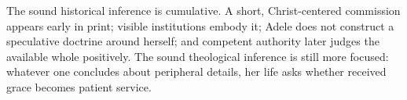 The sound historical inference is cumulative. A short, Christ-centered commission appears early in print; visible institutions embody it; Adele does not construct a speculative doctrine around herself; and competent authority later judges the available whole positively. The sound theological inference is still more focused: whatever one concludes about peripheral details, her life asks whether received grace becomes patient service.
